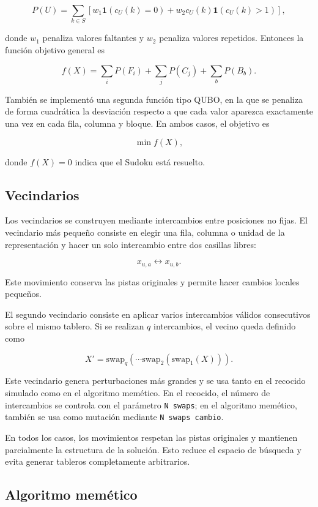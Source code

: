 \documentclass{article}
\begin{document}
\[
P(U)=
\sum_{k\in S}
\left[
w_1\mathbf{1}(c_U(k)=0)
+
w_2c_U(k)\mathbf{1}(c_U(k)>1)
\right],
\]

donde \(w_1\) penaliza valores faltantes y \(w_2\) penaliza valores repetidos. Entonces la función objetivo general es

\[
f(X)=
\sum_i P(F_i)
+
\sum_j P(C_j)
+
\sum_b P(B_b).
\]

También se implementó una segunda función tipo QUBO, en la que se penaliza de forma cuadrática la desviación respecto a que cada valor aparezca exactamente una vez en cada fila, columna y bloque. En ambos casos, el objetivo es

\[
\min f(X),
\]

donde \(f(X)=0\) indica que el Sudoku está resuelto.

\subsection{Vecindarios}

Los vecindarios se construyen mediante intercambios entre posiciones no fijas. El vecindario más pequeño consiste en elegir una fila, columna o unidad de la representación y hacer un solo intercambio entre dos casillas libres:

\[
x_{u,a} \leftrightarrow x_{u,b}.
\]

Este movimiento conserva las pistas originales y permite hacer cambios locales pequeños.

El segundo vecindario consiste en aplicar varios intercambios válidos consecutivos sobre el mismo tablero. Si se realizan \(q\) intercambios, el vecino queda definido como

\[
X' = \text{swap}_q(\cdots \text{swap}_2(\text{swap}_1(X))).
\]

Este vecindario genera perturbaciones más grandes y se usa tanto en el recocido simulado como en el algoritmo memético. En el recocido, el número de intercambios se controla con el parámetro \texttt{N swaps}; en el algoritmo memético, también se usa como mutación mediante \texttt{N swaps cambio}.

En todos los casos, los movimientos respetan las pistas originales y mantienen parcialmente la estructura de la solución. Esto reduce el espacio de búsqueda y evita generar tableros completamente arbitrarios.

\subsection{Algoritmo memético}
\end{document}
